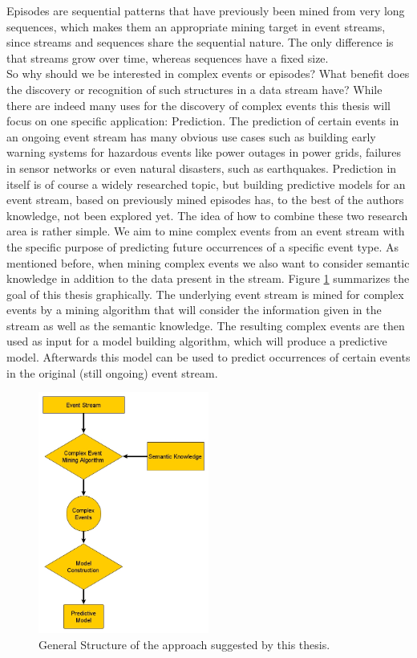 Episodes are sequential patterns that have previously been mined from very long sequences, which makes them an appropriate mining target in event streams, since streams and sequences share the sequential nature. The only difference is that streams grow over time, whereas sequences have a fixed size.\\
So why should we be interested in complex events or episodes? What benefit does the discovery or recognition of such structures in a data stream have? While there are indeed many uses for the discovery of complex events this thesis will focus on one specific application: Prediction. The prediction of certain events in an ongoing event stream has many obvious use cases such as building early warning systems for hazardous events like power outages in power grids, failures in sensor networks or even natural disasters, such as earthquakes. Prediction in itself is of course a widely researched topic, but building predictive models for an event stream, based on previously mined episodes has, to the best of the authors knowledge, not been explored yet.
The idea of how to combine these two research area is rather simple. We aim to mine complex events from an event stream with the specific purpose of predicting future occurrences of a specific event type. As mentioned before, when mining complex events we also want to consider semantic knowledge in addition to the data present in the stream. \newline
Figure \ref{fig_approach} summarizes the goal of this thesis graphically. The underlying event stream is mined for complex events by a mining algorithm that will consider the information given in the stream as well as the semantic knowledge. The resulting complex events are then used as input for a model building algorithm, which will produce a predictive model. Afterwards this model can be used to predict occurrences of certain events in the original (still ongoing) event stream.
\begin{figure}[h]
	\centering
  	\includegraphics[width=0.5\textwidth]{approach.jpg}
	\caption{General Structure of the approach suggested by this thesis.}
	\label{fig_approach}
\end{figure}

